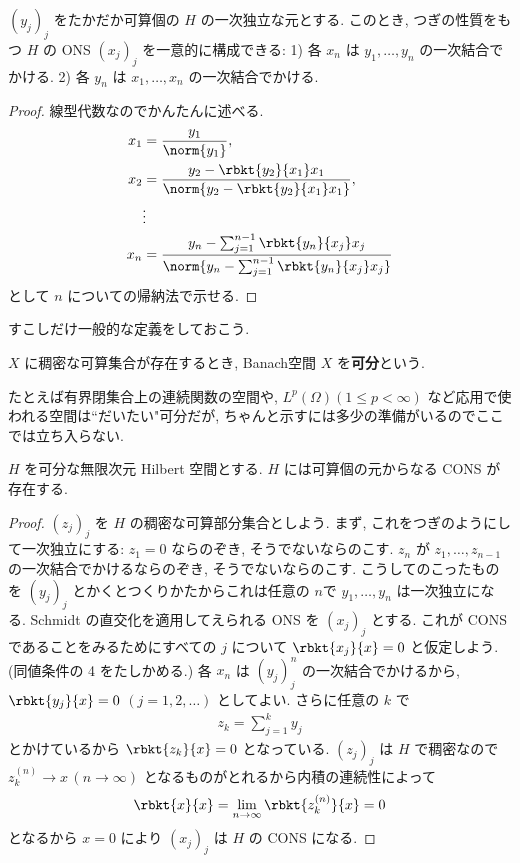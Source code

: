 \documentclass[openany, a4paper, oneside]{jsbook}
\begin{document}
\begin{thm}
 $(y_j)_j$ をたかだか可算個の $H$ の一次独立な元とする.
 このとき, つぎの性質をもつ $H$ の ONS $(x_j)_j$ を一意的に構成できる:
 1) 各 $x_n$ は $y_1, \dots, y_n$ の一次結合でかける.
 2) 各 $y_n$ は $x_1, \dots, x_n$ の一次結合でかける.
\end{thm}
\begin{proof}
線型代数なのでかんたんに述べる.
\begin{align}
 x_1
 &=
 \frac{y_1}{\norm{y_1}}, \\
 x_2
 &=
 \frac{y_2 - \rbkt{y_2}{x_1}x_1}{\norm{y_2 - \rbkt{y_2}{x_1}x_1}}, \\
 &\vdots \\
 x_n
 &=
 \frac{y_n - \sum_{j=1}^{n-1} \rbkt{y_n}{x_j} x_j}{\norm{y_n - \sum_{j=1}^{n-1} \rbkt{y_n}{x_j} x_j}}
\end{align}
として $n$ についての帰納法で示せる.
\end{proof}

すこしだけ一般的な定義をしておこう.
\begin{defn}
$X$ に稠密な可算集合が存在するとき,
Banach空間 $X$ を\textbf{可分}という.
\end{defn}
たとえば有界閉集合上の連続関数の空間や,
$L^p(\Omega) (1 \le p < \infty)$
など応用で使われる空間は``だいたい"可分だが,
ちゃんと示すには多少の準備がいるのでここでは立ち入らない.

\begin{thm}
 $H$ を可分な無限次元 Hilbert 空間とする.
 $H$ には可算個の元からなる CONS が存在する.
\end{thm}
\begin{proof}
$(z_j)_j$ を $H$ の稠密な可算部分集合としよう.
まず, これをつぎのようにして一次独立にする:
$z_1 = 0$ ならのぞき, そうでないならのこす.
$z_n$ が $z_1, \dots, z_{n-1}$ の一次結合でかけるならのぞき,
そうでないならのこす.
こうしてのこったものを $(y_j)_j$ とかくとつくりかたからこれは任意の $n$で $y_1, \dots, y_n$ は一次独立になる.
Schmidt の直交化を適用してえられる ONS を $(x_j)_j$ とする.
これが CONS であることをみるためにすべての $j$ について $\rbkt{x_j}{x} = 0$ と仮定しよう.
(同値条件の 4 をたしかめる.)
各 $x_n$ は $(y_j)_j^n$ の一次結合でかけるから,
$\rbkt{y_j}{x} = 0$ $(j = 1, 2, \dots)$ としてよい.
さらに任意の $k$ で
\begin{align}
 z_k
 =
 \sum_{j=1}^k y_j
\end{align}
とかけているから $\rbkt{z_k}{x} = 0$ となっている.
$(z_j)_j$ は $H$ で稠密なので $z_k^{(n)} \to x \, (n \to \infty)$ となるものがとれるから内積の連続性によって
\begin{align}
 \rbkt{x}{x}
 =
 \lim_{n \to \infty} \rbkt{z_k^{(n)}}{x}
 =
 0
\end{align}
となるから $x=0$ により $(x_j)_j$ は $H$ の CONS になる.
\end{proof}
\end{document}
